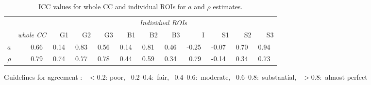 \begin{table}[ht]
\caption{ICC values for whole CC and individual ROIs for $a$ and $\rho$ estimates.}
\begin{adjustbox}{width={\textwidth},totalheight=\textheight,keepaspectratio}
\begin{tabular}{rrrrrrrrrrrr}
      \toprule
       & & \multicolumn{10}{c}{\textit{Individual ROIs}}                                             \\
       & \textit{whole CC} & G1    & G2    & G3    & B1    & B2    & B3    & I     & S1    & S2    & S3\\
       \cmidrule(rl){2-2} \cmidrule(l){3-12}
       \addlinespace
$a$    & 0.66~\usebox{\substantialBox} & 0.14~\usebox{\poorBox}  & 0.83~\usebox{\perfectBox} & 0.56~\usebox{\moderateBox}  & 0.14~\usebox{\poorBox}  & 0.81~\usebox{\perfectBox}  & 0.46~\usebox{\moderateBox}  & -0.25~\usebox{\poorBox} & -0.07~\usebox{\poorBox} & 0.70~\usebox{\substantialBox}  & 0.94~\usebox{\perfectBox}  \\
$\rho$ & 0.79~\usebox{\substantialBox} & 0.74~\usebox{\substantialBox}  & 0.77~\usebox{\substantialBox}  & 0.78~\usebox{\substantialBox}  & 0.44~\usebox{\moderateBox}  & 0.59~\usebox{\moderateBox}  & 0.34~\usebox{\fairBox}  & 0.79~\usebox{\substantialBox}  & -0.14~\usebox{\poorBox} & 0.34~\usebox{\fairBox}  & 0.73~\usebox{\substantialBox}  \\
\bottomrule
\end{tabular}
\end{adjustbox}
{\footnotesize Guidelines for agreement  \citep{Landis:1977}: \usebox{\poorBox}~$<0.2$: poor,  \usebox{\fairBox}~$0.2–0.4$:~fair,  \usebox{\moderateBox}~$0.4–0.6$:~moderate, \usebox{\substantialBox}~$0.6–0.8$:~substantial,  \usebox{\perfectBox}~$>0.8$:~almost perfect}
\end{table}

